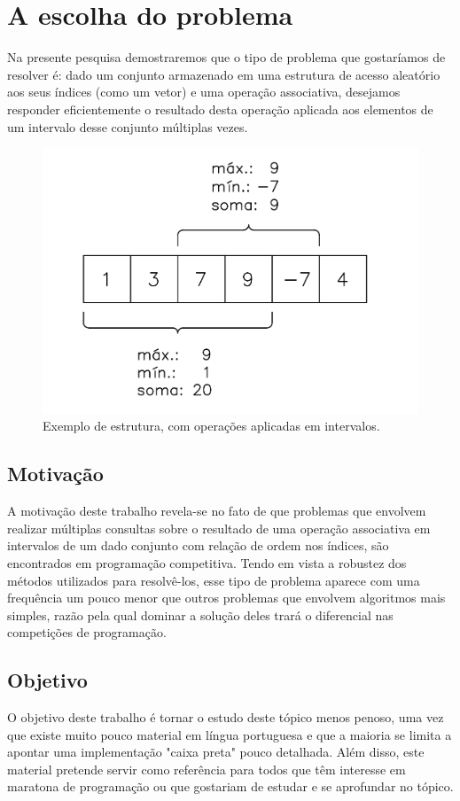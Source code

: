 \chapter{A escolha do problema}
\label{cap:problema}

Na presente pesquisa demostraremos que o tipo de problema que gostaríamos de
resolver é: dado um conjunto armazenado em uma estrutura de acesso aleatório
aos seus índices (como um vetor) e uma operação associativa, desejamos responder 
eficientemente o resultado desta operação aplicada aos elementos de um intervalo 
desse conjunto múltiplas vezes.

\begin{figure}[htb]
\includegraphics[width=12cm]{figuras/fig4.pdf}
\caption{\label{fig:fig4}Exemplo de estrutura, com operações aplicadas em intervalos.}
\end{figure}

\section{Motivação}
A motivação deste trabalho revela-se no fato de que problemas que envolvem 
realizar múltiplas consultas sobre o resultado de uma operação associativa em 
intervalos de um dado conjunto com relação de ordem nos índices, são encontrados 
em programação competitiva. Tendo em vista a robustez dos métodos utilizados para 
resolvê-los, esse tipo de problema aparece com uma frequência um pouco menor que 
outros problemas que envolvem algoritmos mais simples, razão pela qual dominar a 
solução deles trará o diferencial nas competições de programação.

\section{Objetivo}
O objetivo deste trabalho é tornar o estudo deste tópico menos penoso, uma vez 
que existe muito pouco material em língua portuguesa e que a maioria se limita a 
apontar uma implementação "caixa preta" pouco detalhada. Além disso, este material 
pretende servir como referência para todos que têm interesse em maratona de 
programação ou que gostariam de estudar e se aprofundar no tópico.

